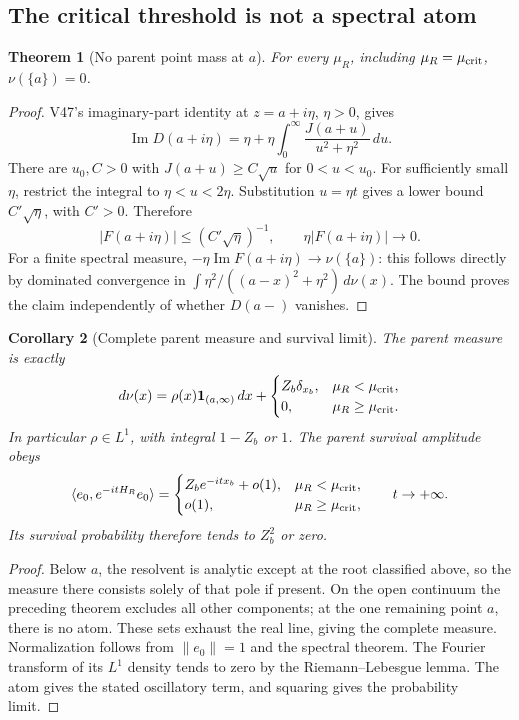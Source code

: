 \documentclass[11pt]{article}
\newtheorem{theorem}{Theorem}[section]
\newtheorem{corollary}[theorem]{Corollary}
\theoremstyle{remark}
\begin{document}
\subsection{The critical threshold is not a spectral atom}

\begin{theorem}[No parent point mass at \(a\)]
\label{thm:v20v48-noatom}
For every \(\mu_R\), including \(\mu_R=\mu_{\rm crit}\),
\(\nu(\{a\})=0\).
\end{theorem}
\begin{proof}
V47's imaginary-part identity at \(z=a+i\eta\), \(\eta>0\),
gives
\[
 \operatorname{Im}D(a+i\eta)
 =\eta+\eta\int_0^\infty
 \frac{J(a+u)}{u^2+\eta^2}\,du.
\]
There are \(u_0,C>0\) with \(J(a+u)\geq C\sqrt u\)
for \(0<u<u_0\).  For sufficiently small \(\eta\), restrict
the integral to \(\eta<u<2\eta\).  Substitution \(u=\eta t\)
gives a lower bound \(C'\sqrt\eta\), with \(C'>0\).
Therefore
\[
 |F(a+i\eta)|\leq(C'\sqrt\eta)^{-1},\qquad
 \eta|F(a+i\eta)|\longrightarrow0.
\]
For a finite spectral measure,
\(-\eta\operatorname{Im}F(a+i\eta)\to\nu(\{a\})\):
this follows directly by dominated convergence in
\(\int \eta^2/((a-x)^2+\eta^2)\,d\nu(x)\).
The bound proves the claim independently of whether \(D(a-)\)
vanishes.
\end{proof}

\begin{corollary}[Complete parent measure and survival limit]
\label{cor:v20v48-survival}
The parent measure is exactly
\[
 d\nu(x)=\rho(x)\mathbf1_{(a,\infty)}\,dx
 +\begin{cases}Z_b\delta_{x_b},&\mu_R<\mu_{\rm crit},\\
 0,&\mu_R\geq\mu_{\rm crit}.
 \end{cases}
\]
In particular \(\rho\in L^1\), with integral \(1-Z_b\) or \(1\).
The parent survival amplitude obeys
\[
 \langle e_0,e^{-itH_R}e_0\rangle
 =\begin{cases}
 Z_b e^{-itx_b}+o(1),&\mu_R<\mu_{\rm crit},\\
 o(1),&\mu_R\geq\mu_{\rm crit},
 \end{cases}\qquad t\to+\infty.
\]
Its survival probability therefore tends to \(Z_b^2\) or zero.
\end{corollary}
\begin{proof}
Below \(a\), the resolvent is analytic except at the root
classified above, so the measure there consists solely of
that pole if present.  On the open continuum the preceding
theorem excludes all other components; at the one remaining
point \(a\), there is no atom.  These sets exhaust the real
line, giving the complete measure.  Normalization follows
from \(\|e_0\|=1\) and the spectral theorem.
The Fourier transform of its \(L^1\) density tends to zero
by the Riemann--Lebesgue lemma.  The atom gives the stated
oscillatory term, and squaring gives the probability limit.
\end{proof}
\end{document}
